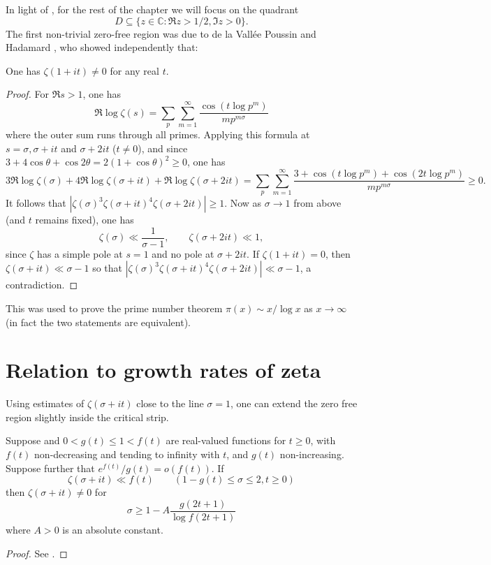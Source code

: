In light of , for the rest of the chapter we will focus on the quadrant 
\[
D\subseteq \{z \in \mathbb{C}: \Re z > 1/2, \Im z > 0\}.
\]
The first non-trivial zero-free region was due to de la Vall\'ee Poussin \cite{de_la_vallee_poussin_recherches_1896} and Hadamard \cite{hadamard_distribution_1896}, who showed independently that:


\begin{theorem}
One has $\zeta(1 + it) \ne 0$ for any real $t$.
\end{theorem}
\begin{proof}
For $\Re s > 1$, one has
\[
\Re \log \zeta(s) = \sum_{p}\sum_{m = 1}^{\infty}\frac{\cos (t \log p^m)}{mp^{m\sigma}}
\]
where the outer sum runs through all primes. Applying this formula at $s = \sigma, \sigma + it$ and $\sigma + 2it$ ($t \ne 0$), and since $3 + 4\cos\theta + \cos 2\theta = 2(1 + \cos\theta)^2 \ge 0$, one has
\[
3\Re \log \zeta(\sigma) + 4\Re \log \zeta(\sigma + it) + \Re\log \zeta(\sigma + 2it) = \sum_{p}\sum_{m = 1}^{\infty}\frac{3 + \cos (t \log p^m) + \cos (2t\log p^m)}{mp^{m\sigma}} \ge 0.
\]
It follows that $|\zeta(\sigma)^3 \zeta(\sigma + it)^4 \zeta(\sigma + 2it)| \ge 1$. Now as $\sigma \to 1$ from above (and $t$ remains fixed), one has
\[
\zeta(\sigma) \ll \frac{1}{\sigma - 1},\qquad \zeta(\sigma + 2it) \ll 1,
\]
since $\zeta$ has a simple pole at $s = 1$ and no pole at $\sigma + 2it$. If $\zeta(1 + it) = 0$, then $\zeta(\sigma + it) \ll \sigma - 1$ so that $|\zeta(\sigma)^3 \zeta(\sigma + it)^4 \zeta(\sigma + 2it)| \ll \sigma - 1$, a contradiction.
\end{proof}

This was used to prove the prime number theorem $\pi(x) \sim x/\log x$ as $x \to \infty$ (in fact the two statements are equivalent).

\section{Relation to growth rates of zeta}

Using estimates of $\zeta(\sigma + it)$ close to the line $\sigma = 1$, one can extend the zero free region slightly inside the critical strip. 

\begin{lemma}\label{mu_to_zero_free}
Suppose and $0 < g(t) \le 1 < f(t)$ are real-valued functions for $t \ge 0$, with $f(t)$ non-decreasing and tending to infinity with $t$, and $g(t)$ non-increasing. Suppose further that $e^{f(t)}/g(t) = o(f(t))$. If 
\[
\zeta(\sigma + it) \ll f(t)\qquad (1 - g(t) \le \sigma \le 2, t \ge 0)
\]
then $\zeta(\sigma + it) \ne 0$ for 
\[
\sigma \ge 1 - A\frac{g(2t + 1)}{\log f(2t + 1)}
\]
where $A > 0$ is an absolute constant. 
\end{lemma}
\begin{proof}
See \cite[Theorem 3.10]{titchmarsh_theory_1986}.
\end{proof}


